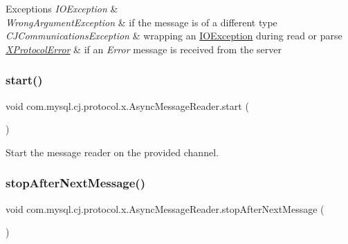 \begin{DoxyExceptions}{Exceptions}
{\em I\+O\+Exception} & \\
\hline
{\em Wrong\+Argument\+Exception} & if the message is of a different type \\
\hline
{\em C\+J\+Communications\+Exception} & wrapping an \mbox{\hyperlink{}{I\+O\+Exception}} during read or parse \\
\hline
{\em \mbox{\hyperlink{classcom_1_1mysql_1_1cj_1_1protocol_1_1x_1_1_x_protocol_error}{X\+Protocol\+Error}}} & if an {\itshape Error} message is received from the server \\
\hline
\end{DoxyExceptions}
\mbox{\label{classcom_1_1mysql_1_1cj_1_1protocol_1_1x_1_1_async_message_reader_a703e921ede276cb42cb6088a40256eb4}} 
\subsubsection{\texorpdfstring{start()}{start()}}
{\footnotesize\ttfamily void com.\+mysql.\+cj.\+protocol.\+x.\+Async\+Message\+Reader.\+start (\begin{DoxyParamCaption}{ }\end{DoxyParamCaption})}

Start the message reader on the provided channel. \mbox{\label{classcom_1_1mysql_1_1cj_1_1protocol_1_1x_1_1_async_message_reader_a5d7ad4e6d2faa3d5fa7ca04feaf6070f}} 
\subsubsection{\texorpdfstring{stop\+After\+Next\+Message()}{stopAfterNextMessage()}}
{\footnotesize\ttfamily void com.\+mysql.\+cj.\+protocol.\+x.\+Async\+Message\+Reader.\+stop\+After\+Next\+Message (\begin{DoxyParamCaption}{ }\end{DoxyParamCaption})}


